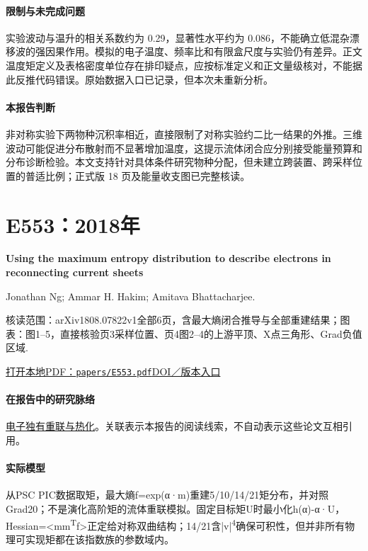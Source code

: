 \documentclass[UTF8,a4paper,11pt,openany,fontset=fandol]{ctexbook}
\begin{document}
\paragraph{限制与未完成问题}实验波动与温升的相关系数约为 0.29，显著性水平约为 0.086，不能确立低混杂漂移波的强因果作用。模拟的电子温度、频率比和有限盒尺度与实验仍有差异。正文温度矩定义及表格密度单位存在排印疑点，应按标准定义和正文量级核对，不能据此反推代码错误。原始数据入口已记录，但本次未重新分析。

\paragraph{本报告判断}非对称实验下两物种沉积率相近，直接限制了对称实验约二比一结果的外推。三维波动可能促进分布散射而不显著增加温度，这提示流体闭合应分别接受能量预算和分布诊断检验。本文支持针对具体条件研究物种分配，但未建立跨装置、跨采样位置的普适比例；正式版 18 页及能量收支图已完整核读。

\section{E553：2018年}\label{paper:E553}

\textbf{Using the maximum entropy distribution to describe electrons in reconnecting current sheets}\citep{E553}\

Jonathan Ng;  Ammar H. Hakim;  Amitava Bhattacharjee.

\textsf{核读范围：}arXiv1808.07822v1全部6页，含最大熵闭合推导与全部重建结果；\textsf{图表：}图1–5，直接核验页3采样位置、页4图2–4的上游平顶、X点三角形、Grad负值区域.

\href{run:../papers/E553.pdf}{打开本地PDF：\texttt{papers/E553.pdf}}\quad\href{https://doi.org/10.1063/1.5041758}{DOI／版本入口}

\paragraph{在报告中的研究脉络}\hyperref[story:energy]{电子独有重联与热化}。关联表示本报告的阅读线索，不自动表示这些论文互相引用。

\paragraph{实际模型}从PSC PIC数据取矩，最大熵f=exp(α·m)重建5/10/14/21矩分布，并对照Grad20；不是演化高阶矩的流体重联模拟。固定目标矩U时最小化h(α)-α·U，Hessian=<mm\textsuperscript{T}f>正定给对称双曲结构；14/21含|v|\textsuperscript{4}确保可积性，但并非所有物理可实现矩都在该指数族的参数域内。
\end{document}
